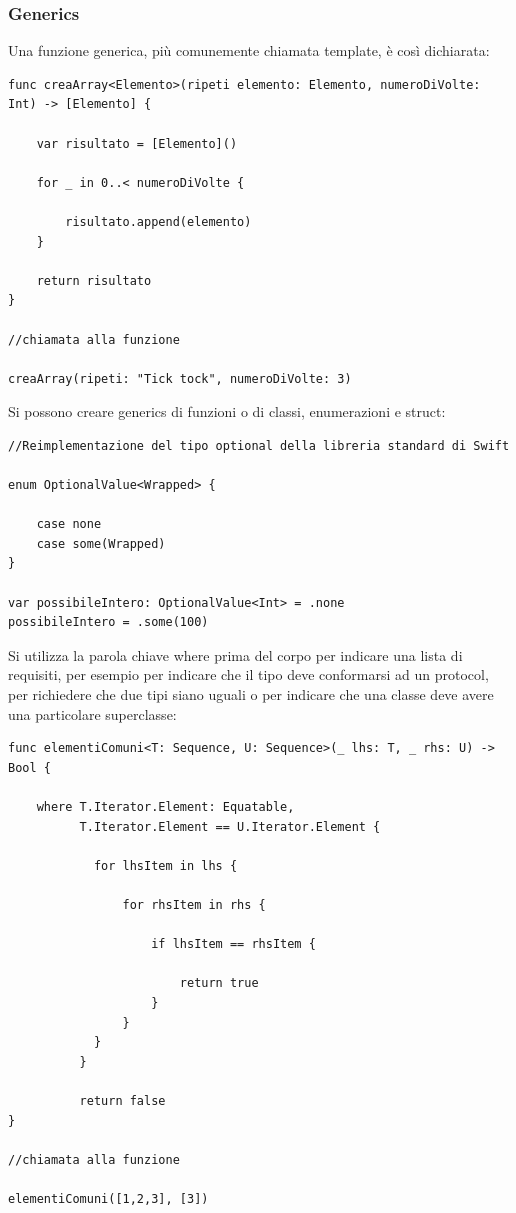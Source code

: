 \subsubsection{Generics}
Una funzione generica, più comunemente chiamata template, è così dichiarata:
\lstset{language=[Objective]C, breakindent=40pt, breaklines} 
\begin{lstlisting}
func creaArray<Elemento>(ripeti	elemento: Elemento, numeroDiVolte: Int) -> [Elemento] {

	var risultato = [Elemento]()
	
	for _ in 0..< numeroDiVolte {
		
		risultato.append(elemento)
	}
	
	return risultato
}

//chiamata alla funzione 

creaArray(ripeti: "Tick tock", numeroDiVolte: 3)
\end{lstlisting}
Si possono creare generics di funzioni o di classi, enumerazioni e struct:
\lstset{language=[Objective]C, breakindent=40pt, breaklines}
\begin{lstlisting}
//Reimplementazione del tipo optional della libreria standard di Swift

enum OptionalValue<Wrapped> {

	case none 
	case some(Wrapped)
}

var possibileIntero: OptionalValue<Int> = .none
possibileIntero = .some(100)
\end{lstlisting}
Si utilizza la parola chiave where prima del corpo per indicare una lista di requisiti, per esempio per indicare che il tipo deve conformarsi ad un protocol, per richiedere che due tipi siano uguali o per indicare che una classe deve avere una particolare superclasse: 
\lstset{language=[Objective]C, breakindent=40pt, breaklines}
\begin{lstlisting}
func elementiComuni<T: Sequence, U: Sequence>(_ lhs: T, _ rhs: U) -> Bool {
	
	where T.Iterator.Element: Equatable,
		  T.Iterator.Element == U.Iterator.Element {
		  
		  	for lhsItem in lhs {
		  	
		  		for rhsItem in rhs {
		  		
		  			if lhsItem == rhsItem {
		  				
		  				return true
		  			}
		  		}
		  	}
		  }
		  
		  return false
}

//chiamata alla funzione 

elementiComuni([1,2,3], [3])
\end{lstlisting}
